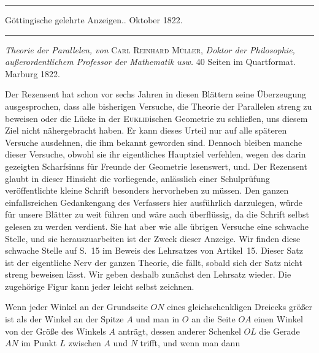 \begin{center}
\rule{.85\textwidth}{.3pt}\par
Göttingische gelehrte Anzeigen.. Oktober 1822.\par
\rule{.85\textwidth}{.3pt}
\end{center}
\hspace*{\parindent}\textit{Theorie der Parallelen, von} \textsc{Carl Reinhard Müller}, \textit{Doktor der Philosophie, außerordentlichem Professor der Mathematik usw.} 40 Seiten im Quartformat. Marburg 1822.

Der Rezensent hat schon vor sechs Jahren in diesen Blättern seine Überzeugung ausgesprochen, dass alle bisherigen Versuche, die Theorie der Parallelen streng zu beweisen oder die Lücke in der \textsc{Euklid}ischen Geometrie zu schließen, uns diesem Ziel nicht nähergebracht haben. Er kann dieses Urteil nur auf alle späteren Versuche ausdehnen, die ihm bekannt geworden sind. Dennoch bleiben manche dieser Versuche, obwohl sie ihr eigentliches Hauptziel verfehlen, wegen des darin gezeigten Scharfsinns für Freunde der Geometrie lesenswert, und. Der Rezensent glaubt in dieser Hinsicht die vorliegende, anlässlich einer Schulprüfung veröffentlichte kleine Schrift besonders hervorheben zu müssen. Den ganzen einfallsreichen Gedankengang des Verfassers hier ausführlich darzulegen, würde für unsere Blätter zu weit führen und wäre auch überflüssig, da die Schrift selbst gelesen zu werden verdient. Sie hat aber wie alle übrigen Versuche eine schwache Stelle, und sie herauszuarbeiten ist der Zweck dieser Anzeige. Wir finden diese schwache Stelle auf S.~15 im Beweis des Lehrsatzes von Artikel~15. Dieser Satz ist der eigentliche Nerv der ganzen Theorie, die fällt, sobald sich der Satz nicht streng beweisen lässt. Wir geben deshalb zunächst den Lehrsatz wieder. Die zugehörige Figur kann jeder leicht selbst zeichnen.

Wenn jeder Winkel an der Grundseite \(ON\) eines gleichschenkligen Dreiecks größer ist als der Winkel an der Spitze \(A\) und man in \(O\) an die Seite \(OA\) einen Winkel von der Größe des Winkels \(A\) anträgt, dessen anderer Schenkel \(OL\) die Gerade \(AN\) im Punkt \(L\) zwischen \(A\) und \(N\) trifft, und wenn man dann
